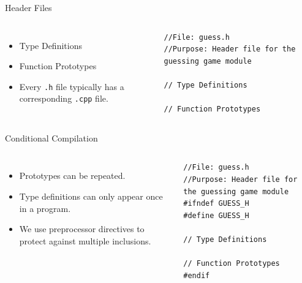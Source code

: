 \documentclass[]{beamer}
\begin{document}
\begin{frame}[fragile]{Header Files}
\begin{columns}
    \begin{itemize}[<+->]
        \item Type Definitions
        \item Function Prototypes
        \item Every \texttt{.h} file typically has a corresponding
        \texttt{.cpp} file.
    \end{itemize}

    \begin{adjustbox}{max width=\textwidth, max totalheight=0.9\textheight}
    \begin{BVerbatim}
//File: guess.h
//Purpose: Header file for the guessing game module

// Type Definitions

// Function Prototypes
    \end{BVerbatim}
    \end{adjustbox}
\end{columns}
\end{frame}

\begin{frame}[fragile]{Conditional Compilation}
\begin{columns}
    \begin{itemize}[<+->]
        \item Prototypes can be repeated.
        \item Type definitions can only appear once in a program.
        \item We use preprocessor directives to protect against
            multiple inclusions.
    \end{itemize}

    \begin{adjustbox}{max width=\textwidth, max totalheight=0.9\textheight}
    \begin{BVerbatim}
//File: guess.h
//Purpose: Header file for the guessing game module
#ifndef GUESS_H
#define GUESS_H

// Type Definitions

// Function Prototypes
#endif
    \end{BVerbatim}
    \end{adjustbox}
\end{columns}
\end{frame}
\end{document}
